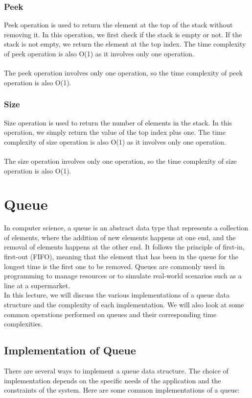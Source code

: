 \documentclass[a4paper, 11pt, oneside]{book} %
\begin{document}
\subsubsection{Peek}
Peek operation is used to return the element at the top of the stack without removing it. In this operation, we first check if the stack is empty or not. If the stack is not empty, we return the element at the top index. The time complexity of peek operation is also O(1) as it involves only one operation.
\\
\\
The peek operation involves only one operation, so the time complexity of peek operation is also O(1).

\subsubsection{Size}
Size operation is used to return the number of elements in the stack. In this operation, we simply return the value of the top index plus one. The time complexity of size operation is also O(1) as it involves only one operation.
\\
\\
The size operation involves only one operation, so the time complexity of size operation is also O(1).




\section{Queue}
In computer science, a queue is an abstract data type that represents a collection of elements, where the addition of new elements happens at one end, and the removal of elements happens at the other end. It follows the principle of first-in, first-out (FIFO), meaning that the element that has been in the queue for the longest time is the first one to be removed. Queues are commonly used in programming to manage resources or to simulate real-world scenarios such as a line at a supermarket.
\\

In this lecture, we will discuss the various implementations of a queue data structure and the complexity of each implementation. We will also look at some common operations performed on queues and their corresponding time complexities.

\subsection{Implementation of Queue}
There are several ways to implement a queue data structure. The choice of implementation depends on the specific needs of the application and the constraints of the system. Here are some common implementations of a queue:
\end{document}
